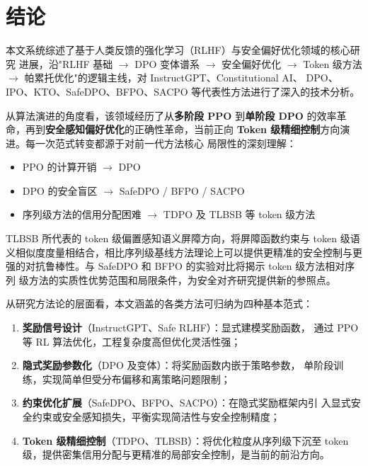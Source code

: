\documentclass[12pt,a4paper,UTF8]{ctexart}
\begin{document}
\section{结论}
\label{sec:conclusion}

本文系统综述了基于人类反馈的强化学习（RLHF）与安全偏好优化领域的核心研究
进展，沿"RLHF 基础 $\to$ DPO 变体谱系 $\to$ 安全偏好优化 $\to$ Token
级方法 $\to$ 帕累托优化"的逻辑主线，对 InstructGPT、Constitutional AI、
DPO、IPO、KTO、SafeDPO、BFPO、SACPO 等代表性方法进行了深入的技术分析。

从算法演进的角度看，该领域经历了从\textbf{多阶段 PPO} 到\textbf{单阶段
DPO} 的效率革命，再到\textbf{安全感知偏好优化}的正确性革命，当前正向
\textbf{Token 级精细控制}方向演进。每一次范式转变都源于对前一代方法核心
局限性的深刻理解：
\begin{itemize}[leftmargin=2em]
  \item PPO 的计算开销 $\to$ DPO
  \item DPO 的安全盲区 $\to$ SafeDPO / BFPO / SACPO
  \item 序列级方法的信用分配困难 $\to$ TDPO 及 TLBSB 等 token 级方法
\end{itemize}

TLBSB 所代表的 token 级偏置感知语义屏障方向，将屏障函数约束与 token 级语
义相似度度量相结合，相比序列级基线方法理论上可以提供更精准的安全控制与更
强的对抗鲁棒性。与 SafeDPO 和 BFPO 的实验对比将揭示 token 级方法相对序列
级方法的实质性优势范围和局限条件，为安全对齐研究提供新的参照点。

从研究方法论的层面看，本文涵盖的各类方法可归纳为四种基本范式：
\begin{enumerate}[leftmargin=2em]
  \item \textbf{奖励信号设计}（InstructGPT、Safe RLHF）：显式建模奖励函数，
    通过 PPO 等 RL 算法优化，工程复杂度高但优化灵活性强；
  \item \textbf{隐式奖励参数化}（DPO 及变体）：将奖励函数内嵌于策略参数，
    单阶段训练，实现简单但受分布偏移和离策略问题限制；
  \item \textbf{约束优化扩展}（SafeDPO、BFPO、SACPO）：在隐式奖励框架内引
    入显式安全约束或安全感知损失，平衡实现简洁性与安全控制精度；
  \item \textbf{Token 级精细控制}（TDPO、TLBSB）：将优化粒度从序列级下沉至
    token 级，提供密集信用分配与更精准的局部安全控制，是当前的前沿方向。
\end{enumerate}
\end{document}
